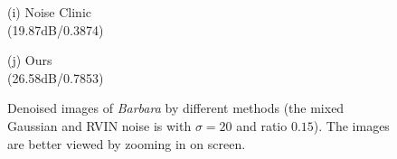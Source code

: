 \documentclass[runningheads]{llncs}
\begin{document}
\begin{figure}
{\begin{minipage}[t]{0.2\textwidth}
{\footnotesize (i) Noise Clinic \\(19.87dB/0.3874)}
\end{minipage}
\begin{minipage}[t]{0.2\textwidth}
\centering
{}
{\footnotesize (j) Ours \\(26.58dB/0.7853)}
\end{minipage}
}
\caption{Denoised images of \textsl{Barbara} by different methods (the mixed Gaussian and RVIN noise is with $\sigma = 20$ and ratio $0.15$). The images are better viewed by zooming in on screen.}
\label{fig8}
\end{figure}\vspace{-0.1in}
\end{document}
